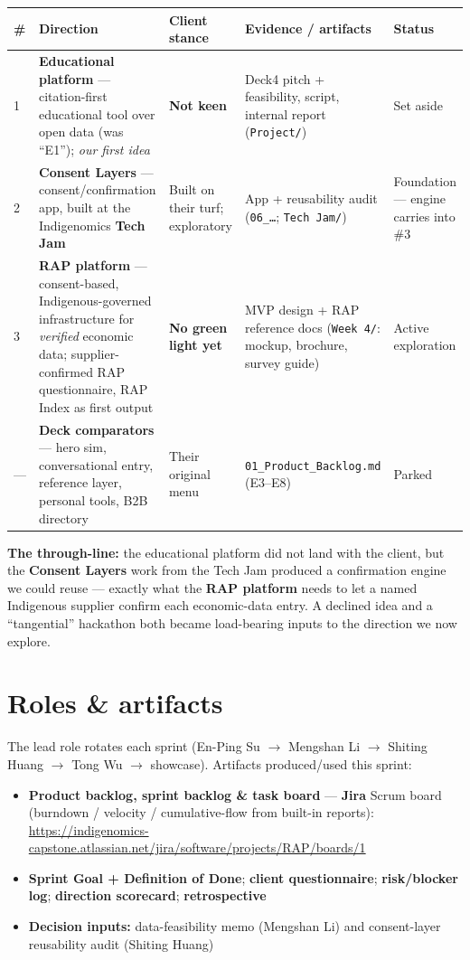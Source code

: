 \documentclass[11pt]{article}
\begin{document}
\smallskip
{\footnotesize
\noindent\begin{tabular}{@{}p{}p{}p{}p{}p{}@{}}
\hline
\textbf{\#} & \textbf{Direction} & \textbf{Client stance} & \textbf{Evidence / artifacts} & \textbf{Status} \\
\hline
1 & \textbf{Educational platform} --- citation-first educational tool over open data (was ``E1''); \emph{our first idea} & \textbf{Not keen} & Deck4 pitch + feasibility, script, internal report (\texttt{Project/}) & Set aside \\
2 & \textbf{Consent Layers} --- consent/confirmation app, built at the Indigenomics \textbf{Tech Jam} & Built on their turf; exploratory & App + reusability audit (\texttt{06\_\dots}; \texttt{Tech Jam/}) & Foundation --- engine carries into \#3 \\
3 & \textbf{RAP platform} --- consent-based, Indigenous-governed infrastructure for \emph{verified} economic data; supplier-confirmed RAP questionnaire, RAP Index as first output & \textbf{No green light yet} & MVP design + RAP reference docs (\texttt{Week 4/}: mockup, brochure, survey guide) & Active exploration \\
--- & \textbf{Deck comparators} --- hero sim, conversational entry, reference layer, personal tools, B2B directory & Their original menu & \texttt{01\_Product\_Backlog.md} (E3--E8) & Parked \\
\hline
\end{tabular}}

\smallskip
\noindent\textbf{The through-line:} the educational platform did not land with the client, but the \textbf{Consent Layers} work from the Tech Jam produced a confirmation engine we could reuse --- exactly what the \textbf{RAP platform} needs to let a named Indigenous supplier confirm each economic-data entry. A declined idea and a ``tangential'' hackathon both became load-bearing inputs to the direction we now explore.

\section{Roles \& artifacts}
The lead role rotates each sprint (En-Ping Su $\rightarrow$ Mengshan Li $\rightarrow$ Shiting Huang $\rightarrow$ Tong Wu $\rightarrow$ showcase). Artifacts produced/used this sprint:
\begin{itemize}
  \item \textbf{Product backlog, sprint backlog \& task board} --- \textbf{Jira} Scrum board (burndown / velocity / cumulative-flow from built-in reports): \url{https://indigenomics-capstone.atlassian.net/jira/software/projects/RAP/boards/1}
  \item \textbf{Sprint Goal + Definition of Done}; \textbf{client questionnaire}; \textbf{risk/blocker log}; \textbf{direction scorecard}; \textbf{retrospective}
  \item \textbf{Decision inputs:} data-feasibility memo (Mengshan Li) and consent-layer reusability audit (Shiting Huang)
\end{itemize}
\end{document}

